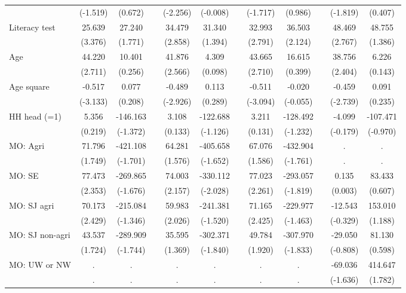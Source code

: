 {\begin{longtable}{@{\extracolsep{\fill}}lccccccccccc}
      & (-1.519) & (0.672) &   & (-2.256) & (-0.008) &   & (-1.717) & (0.986) &   & (-1.819) & (0.407) \\
    Literacy test & 25.639 & 27.240 &   & 34.479 & 31.340 &   & 32.993 & 36.503 &   & 48.469 & 48.755 \\
      & (3.376) & (1.771) &   & (2.858) & (1.394) &   & (2.791) & (2.124) &   & (2.767) & (1.386) \\
    Age & 44.220 & 10.401 &   & 41.876 & 4.309 &   & 43.665 & 16.615 &   & 38.756 & 6.226 \\
      & (2.711) & (0.256) &   & (2.566) & (0.098) &   & (2.710) & (0.399) &   & (2.404) & (0.143) \\
    Age square & -0.517 & 0.077 &   & -0.489 & 0.113 &   & -0.511 & -0.020 &   & -0.459 & 0.091 \\
      & (-3.133) & (0.208) &   & (-2.926) & (0.289) &   & (-3.094) & (-0.055) &   & (-2.739) & (0.235) \\
    HH head (=1) & 5.356 & -146.163 &   & 3.108 & -122.688 &   & 3.211 & -128.492 &   & -4.099 & -107.471 \\
      & (0.219) & (-1.372) &   & (0.133) & (-1.126) &   & (0.131) & (-1.232) &   & (-0.179) & (-0.970) \\
    MO: Agri & 71.796 & -421.108 &   & 64.281 & -405.658 &   & 67.076 & -432.904 &   & . & . \\
      & (1.749) & (-1.701) &   & (1.576) & (-1.652) &   & (1.586) & (-1.761) &   & . & . \\
    MO: SE & 77.473 & -269.865 &   & 74.003 & -330.112 &   & 77.023 & -293.057 &   & 0.135 & 83.433 \\
      & (2.353) & (-1.676) &   & (2.157) & (-2.028) &   & (2.261) & (-1.819) &   & (0.003) & (0.607) \\
    MO: SJ agri & 70.173 & -215.084 &   & 59.983 & -241.381 &   & 71.165 & -229.977 &   & -12.543 & 153.010 \\
      & (2.429) & (-1.346) &   & (2.026) & (-1.520) &   & (2.425) & (-1.463) &   & (-0.329) & (1.188) \\
    MO: SJ non-agri & 43.537 & -289.909 &   & 35.595 & -302.371 &   & 49.784 & -307.970 &   & -29.050 & 81.130 \\
      & (1.724) & (-1.744) &   & (1.369) & (-1.840) &   & (1.920) & (-1.833) &   & (-0.808) & (0.598) \\
    MO: UW or NW & . & . &   & . & . &   & . & . &   & -69.036 & 414.647 \\
      & . & . &   & . & . &   & . & . &   & (-1.636) & (1.782) \\

\end{longtable}}
